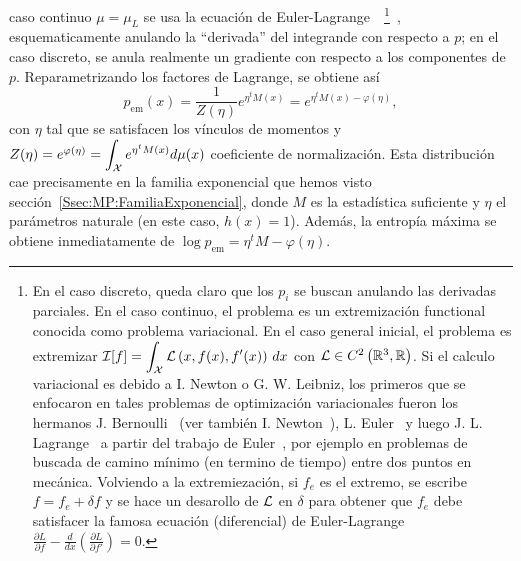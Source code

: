 caso continuo $\mu = \mu_L$ se usa la ecuaci\'on de Euler-Lagrange~ \footnote{En
el caso  discreto, queda claro  que los $p_i$  se buscan anulando  las derivadas
parciales. En  el caso  continuo, el problema  es un  extremizaci\'on functional
conocida como problema variacional.  En el  caso general inicial, el problema es
extremizar $\displaystyle \mathcal{I}[f]  = \int_{\mathcal{X}} \mathcal{L}\left( x , f(x)  , f'(x) \right) \,
dx$ con $\mathcal{L}  \in C^2\left( \mathbb{R}^3 , \mathbb{R} \right)$.   Si el calculo variacional
es debido a I.  Newton o G. W.  Leibniz, los primeros que  se enfocaron en tales
problemas   de    optimizaci\'on   variacionales   fueron   los    hermanos   J.
Bernoulli~\cite{Ber1697,       Ber1701,       Ber1718}      (ver       tambi\'en
I. Newton~\cite{New1696}), L.  Euler~\cite{Eul1738, Eul1744, Eul1766} y luego J.
L.   Lagrange~\cite{Lag1760:1,  Lag1760:2,  Lag1766}  a partir  del  trabajo  de
Euler~\cite{Gol80, Fra92, Fra94, BraSan07}, por  ejemplo en problemas de buscada
de  camino m\'inimo  (en  termino de  tiempo) entre  dos  puntos en  mec\'anica.
Volviendo a la extremiezaci\'on,  si $f_e$ es el extremo, se escribe  $f = f_e +
\delta f$ y se hace un desarollo de  $\mathcal{L}$ en $\delta$ para obtener que $f_e$ debe
satisfacer    la    famosa    ecuaci\'on   (diferencial)    de    Euler-Lagrange
$\displaystyle \frac{\partial L}{\partial f} - \frac{d}{dx} \left( \frac{\partial
L}{\partial  f'}   \right)  =  0$.\label{Foot:SZ:EulerLagrange}}~\cite{GelFom63,
Wei74,  Bru04,  Cla13, Kom14},  esquematicamente  anulando  la ``derivada''  del
integrande  con respecto  a $p$;  en  el caso  discreto, se  anula realmente  un
gradiente con respecto a los  componentes de $p$.  Reparametrizando los factores
de Lagrange, se obtiene as\'i
%
\[
p_{\mathrm{em}}(x) = \frac{1}{Z(\eta)} e^{\eta^t M(x)} = e^{\eta^t M(x) - \varphi(\eta)},
\]
%
con $\eta$  tal que  se satisfacen  los v\'inculos  de momentos  y \  $Z(\eta) =
e^{\varphi(\eta)} =  \displaystyle \int_{\mathcal{X}} e^{\eta^t M(x)}  d\mu(x)$ coeficiente
de  normalizaci\'on.   Esta  distribuci\'on   cae  precisamente  en  la  familia
exponencial  que hemos  visto secci\'on~\ref{Ssec:MP:FamiliaExponencial},  donde
$M$ es  la estad\'istica suficiente y  $\eta$ el par\'ametros naturale  (en este
caso, $h(x) = 1$). Adem\'as, la entrop\'ia m\'axima se obtiene inmediatamente de
$\log p_{\mathrm{em}} = \eta^t M - \varphi(\eta)$.
%

